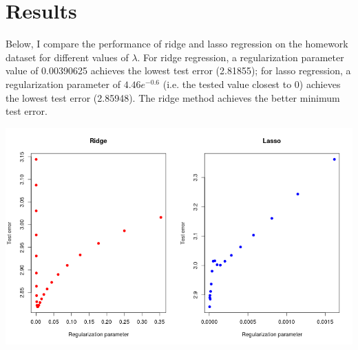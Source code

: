 \documentclass{article}
\begin{document}
\section*{Results}

Below, I compare the performance of ridge and lasso regression on the homework
dataset for different values of $\lambda$. For ridge regression, a
regularization parameter value of 0.00390625 achieves the lowest test error
(2.81855); for lasso regression, a regularization parameter of $4.46e^{-0.6}$
(i.e. the tested value closest to 0) achieves the lowest test error (2.85948).
The ridge method achieves the better minimum test error. 

\includegraphics[scale=0.5]{foo}
\end{document}
